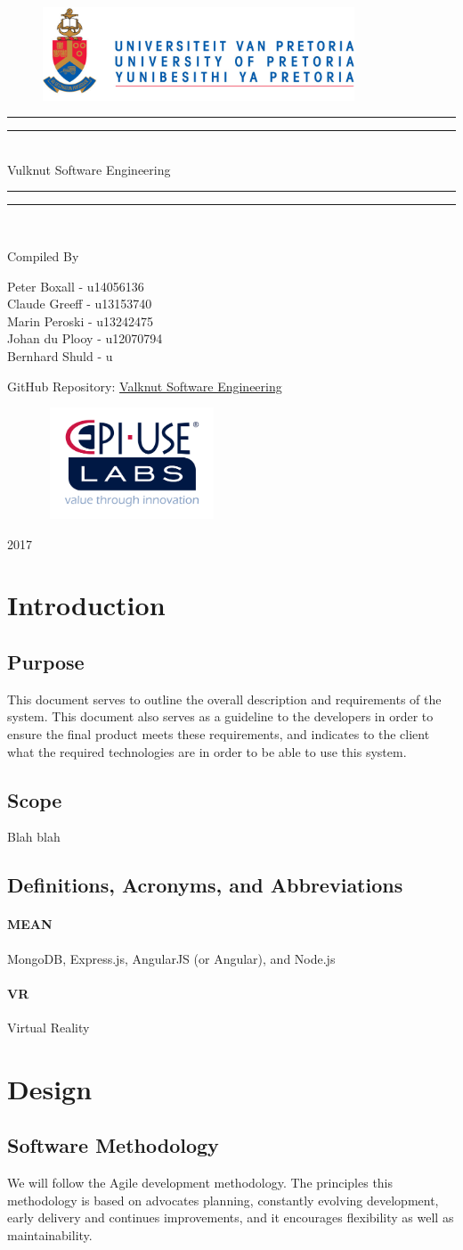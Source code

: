 \documentclass{article}
\newcommand*{\titleGP}{\begingroup
		\begin{figure}[t]
			\centering
			\includegraphics[width=350px]{UP_Logo.PNG}
		\end{figure}		
\centering 
\vspace*{\baselineskip}

\rule{\textwidth}{1.6pt}\vspace*{-\baselineskip}\vspace*{2pt}
\rule{\textwidth}{0.4pt}\\[\baselineskip]

{\Huge Vulknut Software Engineering } \\ [0.2\baselineskip]
\rule{\textwidth}{0.4pt}\vspace*{-\baselineskip}\vspace{3.2pt}
\rule{\textwidth}{1.6pt}\\[\baselineskip] %



\bigskip

Compiled By \\[\baselineskip]

\bigskip

{\Large Peter Boxall - u14056136 \\ Claude Greeff - u13153740 \\ Marin Peroski -  u13242475 \\ Johan du Plooy - u12070794 \\ Bernhard Shuld - u \\\par}

\bigskip
\bigskip
\bigskip
 
 	{\huge GitHub Repository:  
 	\href{https://github.com/Valknut-Software-Engineering/Capstone_Project}{Valknut Software Engineering}\par}
 		 	
\bigskip
\bigskip
\bigskip

	\begin{figure}[H]
			\centering
			\includegraphics[width=200px,height=125px]{epiUse.PNG}
	\end{figure}
	
\vfill

{\Large 2017} \\[0.3\baselineskip]

\endgroup}
\begin{document}
\titleGP
\newpage
\tableofcontents
\newpage

\section{Introduction}

	\subsection{Purpose}
	This document serves to outline the overall description and requirements of 	the system. This document also serves as a guideline to the developers in 		order to ensure the final product meets these requirements, and indicates 		to the client what the required technologies are in order to be able to use 	this system.
	
	\subsection{Scope}
	
	Blah blah	
	
	\subsection{Definitions, Acronyms, and Abbreviations}
			\paragraph{MEAN}	MongoDB, Express.js, AngularJS (or Angular), and Node.js
			\paragraph{VR}	Virtual Reality

\section{Design}

	\subsection{Software Methodology}
	We will follow the Agile development methodology. The principles this methodology is based on advocates planning, constantly evolving development, early delivery and continues improvements, and it encourages flexibility as well as maintainability.
	
\end{document}
